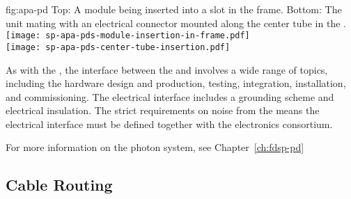 \begin{dunefigure}{fig:apa-pd}
{Top: A  module being inserted into a slot in the frame. Bottom: The  unit mating with an electrical connector mounted along the center tube in the .
}
\texttt{[image: sp-apa-pds-module-insertion-in-frame.pdf]}\\
\vspace{2mm}
\texttt{[image: sp-apa-pds-center-tube-insertion.pdf]}
\end{dunefigure}

As with the , the interface between the  and  involves a wide range of topics, including the hardware design and production, testing, integration, installation, and commissioning. 
The electrical interface includes a grounding scheme and electrical insulation. The strict requirements on noise from the  means the electrical interface must be defined together with the \single electronics consortium. 

For more information on the photon system, see Chapter~\ref{ch:fdsp-pd} %



\subsection{Cable Routing}
\label{sec:fdsp-apa-intfc-cables}

